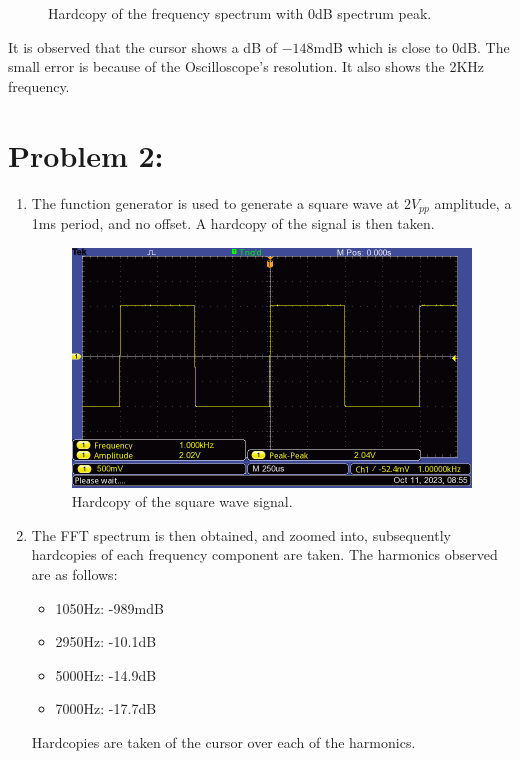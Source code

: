 \begin{enumerate}
\begin{figure}[H]
              \caption{Hardcopy of the frequency spectrum with 0dB spectrum peak.}
              \label{fig:problem1_hardcopy5}
          \end{figure}
          It is observed that the cursor shows a dB of $-148$mdB which is close to $0$dB. The small error is because of the Oscilloscope's resolution. It also shows the 2KHz frequency.
\end{enumerate}

\section{Problem 2:}
\begin{enumerate}
    \item The function generator is used to generate a square wave at $2V_{pp}$ amplitude, a 1ms period, and no offset. A hardcopy of the signal is then taken.
          \begin{figure}[H]
              \centering
              \includegraphics[width=0.75\linewidth]{images/problem2_hardcopy1.png}
              \caption{Hardcopy of the square wave signal.}
              \label{fig:problem2_hardcopy1}
          \end{figure}
    \item The FFT spectrum is then obtained, and zoomed into, subsequently hardcopies of each frequency component are taken. The harmonics observed are as follows:
          \begin{itemize}
              \item 1050Hz: -989mdB
              \item 2950Hz: -10.1dB
              \item 5000Hz: -14.9dB
              \item 7000Hz: -17.7dB
          \end{itemize}
          Hardcopies are taken of the cursor over each of the harmonics.
          \begin{figure}[H]

\end{figure}
\end{enumerate}
